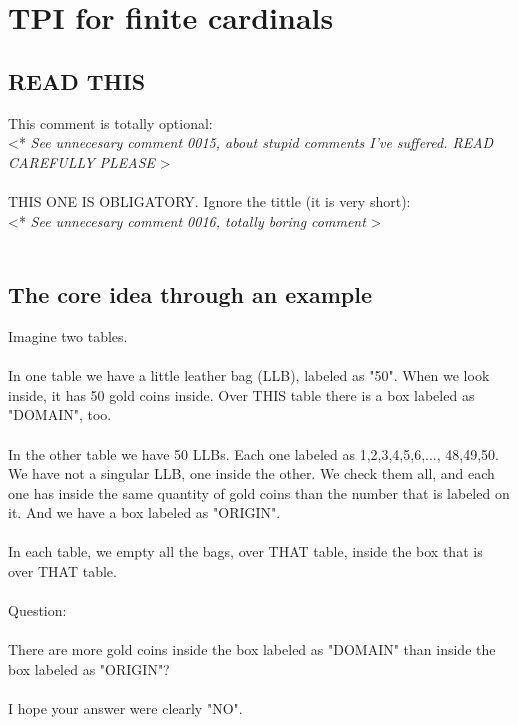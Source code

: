 \chapter{TPI for finite cardinals}

	\section{READ THIS}
	
		\noindent
		This comment is totally optional:\\
		\textless ** \textit{See unnecesary comment 0015, about stupid comments I've suffered. READ CAREFULLY PLEASE} \textgreater
		\\\\
		
		\noindent
		THIS ONE IS OBLIGATORY. Ignore the tittle (it is very short): \\
		\textless ** \textit{See unnecesary comment 0016, totally boring comment} \textgreater
		\\\\
		
		
	
	\section{The core idea through an example}
	
		\noindent
		Imagine two tables.
		\\\\
		
		\noindent
		In one table we have a little leather bag (LLB), labeled as "50". When we look inside, it has 50 gold coins inside. Over THIS table there is a box labeled as "DOMAIN", too.
		\\\\
		
		\noindent
		In the other table we have 50 LLBs. Each one labeled as 1,2,3,4,5,6,..., 48,49,50. We have not a singular LLB, one inside the other. We check them all, and each one has inside the same quantity of gold coins than the number that is labeled on it. And we have a box labeled as "ORIGIN".
		\\\\
		
		\noindent
		In each table, we empty all the bags, over THAT table, inside the box that is over THAT table.
		\\\\
		
		\noindent
		Question:\\\\
		There are more gold coins inside the box labeled as "DOMAIN" than inside the box labeled as "ORIGIN"?\\\\
		I hope your answer were clearly "NO".
		\\\\
		
